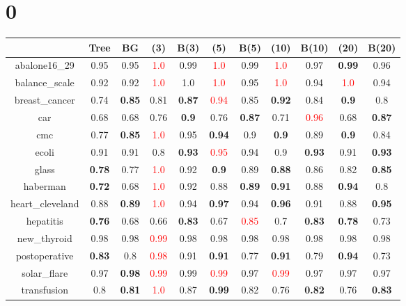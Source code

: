 \documentclass{article}%
\begin{document}
%
\normalsize%
\section*{0}%
\begin{tabular}{c|cccccccccc}%
\hline%
&Tree&BG&(3)&B(3)&(5)&B(5)&(10)&B(10)&(20)&B(20)\\%
\hline%
abalone16\_29&0.95&0.95&\textcolor{red}{ 
1.0
}&0.99&\textcolor{red}{ 
1.0
}&0.99&\textcolor{red}{ 
1.0
}&0.97&\textbf{0.99}&0.96\\%
\hline%
balance\_scale&0.92&0.92&\textcolor{red}{ 
1.0
}&1.0&\textcolor{red}{ 
1.0
}&0.95&\textcolor{red}{ 
1.0
}&0.94&\textcolor{red}{ 
1.0
}&0.94\\%
\hline%
breast\_cancer&0.74&\textbf{0.85}&0.81&\textbf{0.87}&\textcolor{red}{ 
0.94
}&0.85&\textbf{0.92}&0.84&\textbf{0.9}&0.8\\%
\hline%
car&0.68&0.68&0.76&\textbf{0.9}&0.76&\textbf{0.87}&0.71&\textcolor{red}{ 
0.96
}&0.68&\textbf{0.87}\\%
\hline%
cmc&0.77&\textbf{0.85}&\textcolor{red}{ 
1.0
}&0.95&\textbf{0.94}&0.9&\textbf{0.9}&0.89&\textbf{0.9}&0.84\\%
\hline%
ecoli&0.91&0.91&0.8&\textbf{0.93}&\textcolor{red}{ 
0.95
}&0.94&0.9&\textbf{0.93}&0.91&\textbf{0.93}\\%
\hline%
glass&\textbf{0.78}&0.77&\textcolor{red}{ 
1.0
}&0.92&\textbf{0.9}&0.89&\textbf{0.88}&0.86&0.82&\textbf{0.85}\\%
\hline%
haberman&\textbf{0.72}&0.68&\textcolor{red}{ 
1.0
}&0.92&0.88&\textbf{0.89}&\textbf{0.91}&0.88&\textbf{0.94}&0.8\\%
\hline%
heart\_cleveland&0.88&\textbf{0.89}&\textcolor{red}{ 
1.0
}&0.94&\textbf{0.97}&0.94&\textbf{0.96}&0.91&0.88&\textbf{0.95}\\%
\hline%
hepatitis&\textbf{0.76}&0.68&0.66&\textbf{0.83}&0.67&\textcolor{red}{ 
0.85
}&0.7&\textbf{0.83}&\textbf{0.78}&0.73\\%
\hline%
new\_thyroid&0.98&0.98&\textcolor{red}{ 
0.99
}&0.98&0.98&0.98&0.98&0.98&0.98&0.98\\%
\hline%
postoperative&\textbf{0.83}&0.8&\textcolor{red}{ 
0.98
}&0.91&\textbf{0.91}&0.77&\textbf{0.91}&0.79&\textbf{0.94}&0.73\\%
\hline%
solar\_flare&0.97&\textbf{0.98}&\textcolor{red}{ 
0.99
}&0.99&\textcolor{red}{ 
0.99
}&0.97&\textcolor{red}{ 
0.99
}&0.97&0.97&0.97\\%
\hline%
transfusion&0.8&\textbf{0.81}&\textcolor{red}{ 
1.0
}&0.87&\textbf{0.99}&0.82&0.76&\textbf{0.82}&0.76&\textbf{0.83}\\%

\end{tabular}
\end{document}
